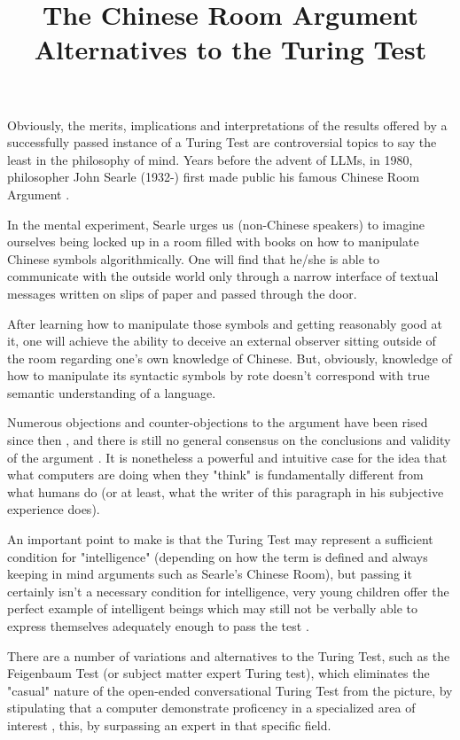 \title{ The Chinese Room Argument}

Obviously, the merits, implications and interpretations of the results offered by a successfully passed instance of a Turing Test are controversial topics to say the least in the philosophy of mind. Years before the advent of LLMs, in 1980, philosopher John Searle (1932-) first made public his famous Chinese Room Argument \cite{searle1999chinese}.

In the mental experiment, Searle urges us (non-Chinese speakers) to imagine ourselves being locked up in a room filled with books on how to manipulate Chinese symbols algorithmically. One will find that he/she is able to communicate with the outside world only through a narrow interface of textual messages written on slips of paper and passed through the door.

After learning how to manipulate those symbols and getting reasonably good at it, one will achieve the ability to deceive an external observer sitting outside of the room regarding one's own knowledge of Chinese. But, obviously, knowledge of how to manipulate its syntactic symbols by rote doesn't correspond with true semantic understanding of a language.

Numerous objections and counter-objections to the argument have been rised since then \cite{chineseroomstan}, and there is still no general consensus on the conclusions and validity of the argument \cite{chineseroomstan}. It is nonetheless a powerful and intuitive case for the idea that what computers are doing when they "think" is fundamentally different from what humans do (or at least, what the writer of this paragraph in his subjective experience does).

\title{ Alternatives to the Turing Test}

An important point to make is that the Turing Test may represent a sufficient condition for "intelligence" (depending on how the term is defined and always keeping in mind arguments such as Searle's Chinese Room), but passing it certainly isn't a necessary condition for intelligence, very young children offer the perfect example of intelligent beings which may still not be verbally able to express themselves adequately enough to pass the test \cite{smith2006history}.

There are a number of variations and alternatives to the Turing Test, such as the Feigenbaum Test (or subject matter expert Turing test), which eliminates the "casual" nature of the open-ended conversational Turing Test from the picture, by stipulating that a computer demonstrate proficency in a specialized area of interest \cite{smith2006history}, this, by surpassing an expert in that specific field.

